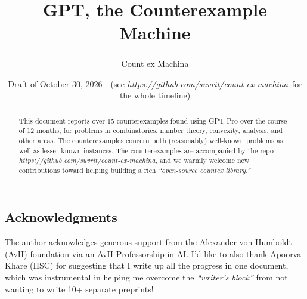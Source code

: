 \documentclass[11pt]{amsart}
\title{GPT, the Counterexample Machine}
\author[Count ex Machina]{Count ex Machina\textsuperscript{\normalfont*}}
\date{Draft of October 30, 2026~~(see {\fontfamily{ppl}\selectfont\itshape\href{https://github.com/suvrit/count-ex-machina}{https://github.com/suvrit/count-ex-machina}}~for the whole timeline)}
\numberwithin{equation}{section}   %
\begin{document}
\begin{abstract}
  This document reports over 15 counterexamples found using GPT Pro over the course of 12 months, for problems in combinatorics, number theory, convexity, analysis, and other areas. The counterexamples concern both (reasonably) well-known problems as well as lesser known instances. The counterexamples are accompanied by the repo \href{https://github.com/suvrit/count-ex-machina}{\selectfont\itshape https://github.com/suvrit/count-ex-machina}, and we warmly welcome new contributions toward helping building a rich \emph{``open-source countex library.''}
\end{abstract}
\maketitle










\vspace*{1cm}
\subsection*{Acknowledgments}
The author acknowledges generous support from the Alexander von Humboldt (AvH) foundation via an AvH Professorship in AI. I'd like to also thank Apoorva Khare (IISC) for suggesting that I write up all the progress in one document, which was instrumental in helping me overcome the \emph{``writer's block''} from not wanting to write 10+ separate preprints!
\end{document}
